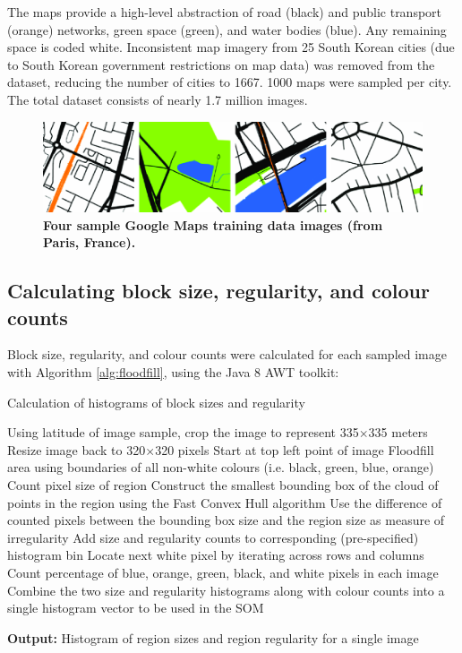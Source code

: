 \documentclass[9pt,twocolumn,twoside,lineno]{pnas-new}
\begin{document}
{The maps provide a high-level abstraction of road (black) and public transport (orange) networks, green space (green), and water bodies (blue). Any remaining space is coded white. Inconsistent map imagery from 25 South Korean cities (due to South Korean government restrictions on map data\cite{Badalge2018}) was removed from the dataset, reducing the number of cities to 1667. 1000 maps were sampled per city. The total dataset consists of nearly 1.7 million images.

\begin{figure}
\centering
\includegraphics[trim={0 0 0 0},clip,scale=0.10]{BlockTypologies_Figures2-4.png}
\caption{\bf Four sample Google Maps training data images (from Paris, France)\cite{GoogleStatic2017}.}
 \label{fig:maps}
\end{figure} 

\subsection*{Calculating block size, regularity, and colour counts}\label{methodscalc}

Block size, regularity, and colour counts were calculated for each sampled image with Algorithm \ref{alg:floodfill}, using the Java 8 AWT toolkit\cite{Oracle2018}:

\begin{algorithm}
  \caption{Calculation of histograms of block sizes and regularity}
\begin{algorithmic}
\label{alg:floodfill}
\State Using latitude of image sample, crop the image to represent 335$\times$335 meters
\State Resize image back to 320$\times$320 pixels
\State Start at top left point of image
  \State Floodfill area using boundaries of all non-white colours (i.e. black, green, blue, orange)
  \State Count pixel size of region
  \State Construct the smallest bounding box of the cloud of points in the region using the Fast Convex Hull algorithm\cite{Javagl2017,GoogleArchive2011}
  \State Use the difference of counted pixels between the bounding box size and the region size as measure of irregularity
  \State Add size and regularity counts to corresponding (pre-specified) histogram bin
  \State Locate next white pixel by iterating across rows and columns
\EndWhile
\State  Count percentage of blue, orange, green, black, and white pixels in each image
\State  Combine the two size and regularity histograms along with colour counts into a single histogram vector to be used in the SOM
\end{algorithmic}
  \hspace*{\algorithmicindent} \textbf{Output:} Histogram of region sizes and region regularity for a single image
\end{algorithm}


}
\end{document}

